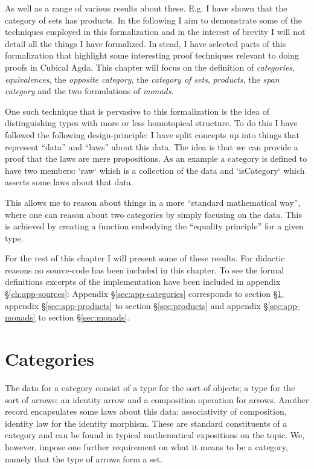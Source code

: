 %
As well as a range of various results about these. E.g. I have shown
that the category of sets has products. In the following I aim to
demonstrate some of the techniques employed in this formalization and
in the interest of brevity I will not detail all the things I have
formalized. In stead, I have selected parts of this formalization that
highlight some interesting proof techniques relevant to doing proofs
in Cubical Agda. This chapter will focus on the definition of
\emph{categories}, \emph{equivalences}, the \emph{opposite category},
the \emph{category of sets}, \emph{products}, the \emph{span category}
and the two formulations of \emph{monads}.

One such technique that is pervasive to this formalization is the idea of
distinguishing types with more or less homotopical structure. To do this I have
followed the following design-principle: I have split concepts up into things
that represent ``data'' and ``laws'' about this data. The idea is that we can
provide a proof that the laws are mere propositions. As an example a category is
defined to have two members: `raw` which is a collection of the data and
`isCategory` which asserts some laws about that data.

This allows me to reason about things in a more ``standard mathematical way'',
where one can reason about two categories by simply focusing on the data. This
is achieved by creating a function embodying the ``equality principle'' for a
given type.

For the rest of this chapter I will present some of these results. For didactic
reasons no source-code has been included in this chapter. To see the formal
definitions excerpts of the implementation have been included in appendix
\S\ref{ch:app-sources}:
Appendix
\S\ref{sec:app-categories} corresponds to section \S\ref{sec:categories},
appendix \S\ref{sec:app-products} to section \S\ref{sec:products}
and appendix \S\ref{sec:app-monads} to section \S\ref{sec:monads}.


\section{Categories}
\label{sec:categories}
The data for a category consist of a type for the sort of objects; a type for
the sort of arrows; an identity arrow and a composition operation for arrows.
Another record encapsulates some laws about this data: associativity of
composition, identity law for the identity morphism. These are standard
constituents of a category and can be found in typical mathematical expositions
on the topic. We, however, impose one further requirement on what it means to be
a category, namely that the type of arrows form a set.

